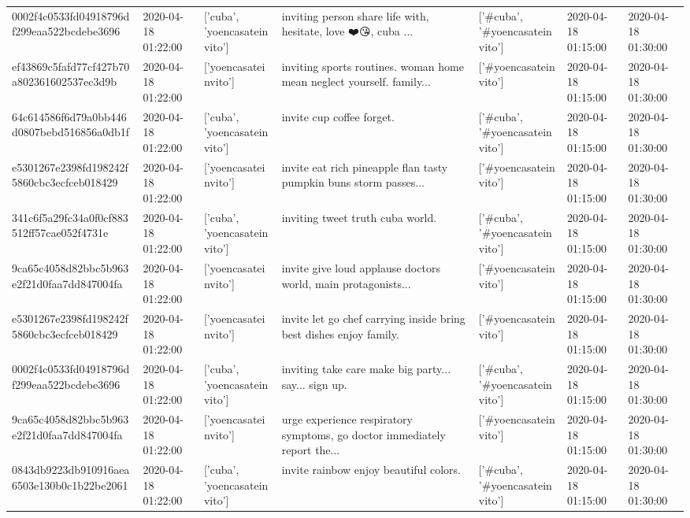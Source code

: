\begin{tabular}{lllllll}
0002f4c0533fd04918796df299eaa522bcdebe3696 & 2020-04-18 01:22:00 & ['cuba', 'yoencasateinvito'] & inviting person share life with, hesitate, love ❤️😘, cuba ... & ['#cuba', '#yoencasateinvito'] & 2020-04-18 01:15:00 & 2020-04-18 01:30:00 \\
ef43869c5fafd77cf427b70a802361602537ec3d9b & 2020-04-18 01:22:00 & ['yoencasateinvito'] & inviting sports routines. woman home mean neglect yourself. family... & ['#yoencasateinvito'] & 2020-04-18 01:15:00 & 2020-04-18 01:30:00 \\
64c614586f6d79a0bb446d0807bebd516856a0db1f & 2020-04-18 01:22:00 & ['cuba', 'yoencasateinvito'] & invite cup coffee forget. & ['#cuba', '#yoencasateinvito'] & 2020-04-18 01:15:00 & 2020-04-18 01:30:00 \\
e5301267e2398fd198242f5860cbc3ecfceb018429 & 2020-04-18 01:22:00 & ['yoencasateinvito'] & invite eat rich pineapple flan tasty pumpkin buns storm passes... & ['#yoencasateinvito'] & 2020-04-18 01:15:00 & 2020-04-18 01:30:00 \\
341c6f5a29fc34a0f0cf883512ff57cae052f4731e & 2020-04-18 01:22:00 & ['cuba', 'yoencasateinvito'] & inviting tweet truth cuba world. & ['#cuba', '#yoencasateinvito'] & 2020-04-18 01:15:00 & 2020-04-18 01:30:00 \\
9ca65c4058d82bbc5b963e2f21d0faa7dd847004fa & 2020-04-18 01:22:00 & ['yoencasateinvito'] & invite give loud applause doctors world, main protagonists... & ['#yoencasateinvito'] & 2020-04-18 01:15:00 & 2020-04-18 01:30:00 \\
e5301267e2398fd198242f5860cbc3ecfceb018429 & 2020-04-18 01:22:00 & ['yoencasateinvito'] & invite let go chef carrying inside bring best dishes enjoy family. & ['#yoencasateinvito'] & 2020-04-18 01:15:00 & 2020-04-18 01:30:00 \\
0002f4c0533fd04918796df299eaa522bcdebe3696 & 2020-04-18 01:22:00 & ['cuba', 'yoencasateinvito'] & inviting take care make big party... say... sign up. & ['#cuba', '#yoencasateinvito'] & 2020-04-18 01:15:00 & 2020-04-18 01:30:00 \\
9ca65c4058d82bbc5b963e2f21d0faa7dd847004fa & 2020-04-18 01:22:00 & ['yoencasateinvito'] & urge experience respiratory symptoms, go doctor immediately report the... & ['#yoencasateinvito'] & 2020-04-18 01:15:00 & 2020-04-18 01:30:00 \\
0843db9223db910916aea6503e130b0c1b22be2061 & 2020-04-18 01:22:00 & ['cuba', 'yoencasateinvito'] & invite rainbow enjoy beautiful colors. & ['#cuba', '#yoencasateinvito'] & 2020-04-18 01:15:00 & 2020-04-18 01:30:00 \\

\end{tabular}
